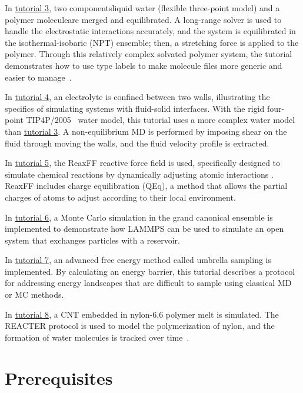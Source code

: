 \documentclass[9pt,tutorial]{livecoms}
\begin{document}
In \hyperref[all-atom-label]{tutorial 3}, two components\textemdash liquid water
(flexible three-point model) and a polymer molecule\textemdash are merged and
equilibrated.  A long-range solver is used to handle the electrostatic
interactions accurately, and the system is equilibrated in the
isothermal-isobaric (NPT) ensemble; then, a stretching force is applied
to the polymer.  Through this relatively complex solvated polymer
system, the tutorial demonstrates how to use type labels to make
molecule files more generic and easier to manage~\cite{gissinger2024type}.

In \hyperref[sheared-confined-label]{tutorial 4}, an electrolyte is
confined between two walls, illustrating the specifics of simulating
systems with fluid-solid interfaces.  With the rigid four-point
TIP4P/2005~\cite{abascal2005general} water model, this tutorial uses a
more complex water model than \hyperref[all-atom-label]{tutorial 3}.  A
non-equilibrium MD is performed by imposing shear on the fluid through
moving the walls, and the fluid velocity profile is extracted.

In \hyperref[reactive-silicon-dioxide-label]{tutorial 5}, the ReaxFF
reactive force field is used, specifically designed to simulate chemical
reactions by dynamically adjusting atomic interactions
\cite{van2001reaxff}.  ReaxFF includes charge equilibration (QEq), a
method that allows the partial charges of atoms to adjust according to
their local environment.

In \hyperref[gcmc-silica-label]{tutorial 6}, a Monte Carlo simulation in
the grand canonical ensemble is implemented to demonstrate how LAMMPS
can be used to simulate an open system that exchanges particles with a
reservoir.

In \hyperref[umbrella-sampling-label]{tutorial 7}, an advanced free
energy method called umbrella sampling is implemented.  By calculating
an energy barrier, this tutorial describes a protocol
for addressing energy landscapes that are difficult to sample using
classical MD or MC methods.

In \hyperref[bond-react-label]{tutorial 8}, a CNT embedded in
nylon-6,6 polymer melt is simulated.  The
REACTER protocol is used to model the polymerization of nylon, and the formation
of water molecules is tracked over time~\cite{gissinger2020reacter}.

\section{Prerequisites}
\end{document}
